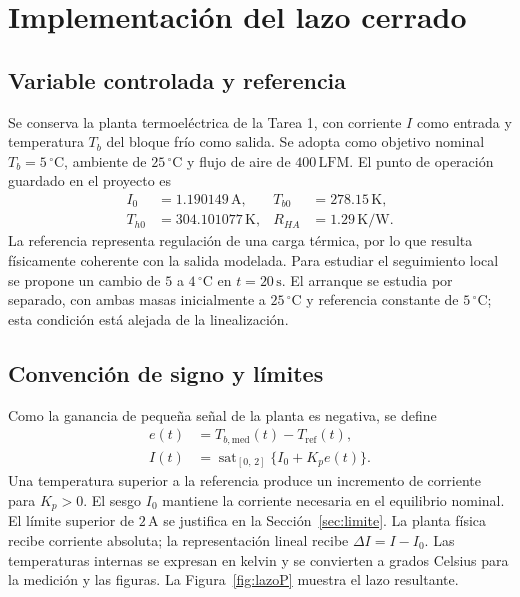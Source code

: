 \section{Implementación del lazo cerrado}\label{sec:lazo}
\subsection{Variable controlada y referencia}
Se conserva la planta termoeléctrica de la Tarea 1, con corriente $I$ como entrada y temperatura $T_b$ del bloque frío como salida. Se adopta como objetivo nominal $T_b=5\,{}^\circ\mathrm C$, ambiente de $25\,{}^\circ\mathrm C$ y flujo de aire de $400\,\mathrm{LFM}$. El punto de operación guardado en el proyecto es
\begin{align}
 I_0&=1.190149\,\mathrm A, &T_{b0}&=278.15\,\mathrm K,\\
 T_{h0}&=304.101077\,\mathrm K, &R_{HA}&=1.29\,\mathrm{K/W}.
\end{align}
La referencia representa regulación de una carga térmica, por lo que resulta físicamente coherente con la salida modelada. Para estudiar el seguimiento local se propone un cambio de $5$ a $4\,{}^\circ\mathrm C$ en $t=20\,\mathrm s$. El arranque se estudia por separado, con ambas masas inicialmente a $25\,{}^\circ\mathrm C$ y referencia constante de $5\,{}^\circ\mathrm C$; esta condición está alejada de la linealización.

\subsection{Convención de signo y límites}
Como la ganancia de pequeña señal de la planta es negativa, se define
\begin{align}
 e(t)&=T_{b,\mathrm{med}}(t)-T_{\mathrm{ref}}(t),\label{eq:error}\\
 I(t)&=\operatorname{sat}_{[0,\,2]}\{I_0+K_p e(t)\}.\label{eq:leyP}
\end{align}
Una temperatura superior a la referencia produce un incremento de corriente para $K_p>0$. El sesgo $I_0$ mantiene la corriente necesaria en el equilibrio nominal. El límite superior de $2\,\mathrm A$ se justifica en la Sección~\ref{sec:limite}. La planta física recibe corriente absoluta; la representación lineal recibe $\Delta I=I-I_0$. Las temperaturas internas se expresan en kelvin y se convierten a grados Celsius para la medición y las figuras. La Figura~\ref{fig:lazoP} muestra el lazo resultante.

